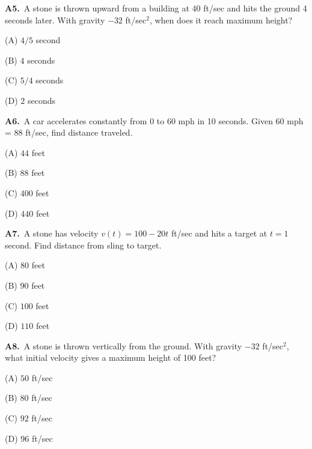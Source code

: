 \documentclass[11pt]{article}
\begin{document}
\bigskip\noindent\textbf{A5.}\ A stone is thrown upward from a building at 40 ft/sec and hits the ground 4 seconds later. With gravity $-32$ ft/sec$^2$, when does it reach maximum height?
\begin{list}{}{\setlength{\leftmargin}{3em}\setlength{\labelwidth}{2.5em}\setlength{\itemsep}{0pt}\setlength{\topsep}{2pt}}
\item[(A)] $4/5$ second
\item[(B)] $4$ seconds
\item[(C)] $5/4$ seconds
\item[(D)] $2$ seconds
\end{list}

\bigskip\noindent\textbf{A6.}\ A car accelerates constantly from 0 to 60 mph in 10 seconds. Given 60 mph = 88 ft/sec, find distance traveled.
\begin{list}{}{\setlength{\leftmargin}{3em}\setlength{\labelwidth}{2.5em}\setlength{\itemsep}{0pt}\setlength{\topsep}{2pt}}
\item[(A)] $44$ feet
\item[(B)] $88$ feet
\item[(C)] $400$ feet
\item[(D)] $440$ feet
\end{list}

\bigskip\noindent\textbf{A7.}\ A stone has velocity $v(t)=100-20t$ ft/sec and hits a target at $t=1$ second. Find distance from sling to target.
\begin{list}{}{\setlength{\leftmargin}{3em}\setlength{\labelwidth}{2.5em}\setlength{\itemsep}{0pt}\setlength{\topsep}{2pt}}
\item[(A)] $80$ feet
\item[(B)] $90$ feet
\item[(C)] $100$ feet
\item[(D)] $110$ feet
\end{list}

\bigskip\noindent\textbf{A8.}\ A stone is thrown vertically from the ground. With gravity $-32$ ft/sec$^2$, what initial velocity gives a maximum height of 100 feet?
\begin{list}{}{\setlength{\leftmargin}{3em}\setlength{\labelwidth}{2.5em}\setlength{\itemsep}{0pt}\setlength{\topsep}{2pt}}
\item[(A)] $50$ ft/sec
\item[(B)] $80$ ft/sec
\item[(C)] $92$ ft/sec
\item[(D)] $96$ ft/sec
\end{list}
\end{document}
